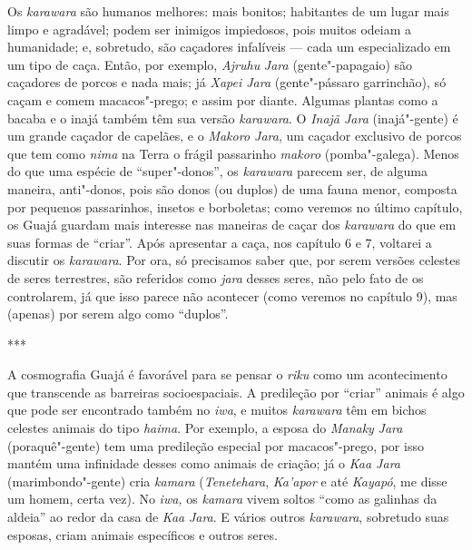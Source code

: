 Os \emph{karawara} são humanos melhores: mais bonitos; habitantes de um
lugar mais limpo e agradável; podem ser inimigos impiedosos, pois muitos
odeiam a humanidade; e, sobretudo, são caçadores infalíveis --- cada um
especializado em um tipo de caça. Então, por exemplo, \emph{Ajruhu}
\emph{Jara} (gente"-papagaio) são caçadores de porcos e nada mais; já
\emph{Xapei Jara} (gente"-pássaro garrinchão), só caçam e comem
macacos"-prego; e assim por diante. Algumas plantas como a bacaba e o
inajá também têm sua versão \emph{karawara}. O \emph{Inajã Jara}
(inajá"-gente) é um grande caçador de capelães, e o \emph{Makoro Jara},
um caçador exclusivo de porcos que tem como \emph{nima} na Terra o
frágil passarinho \emph{makoro} (pomba"-galega). Menos do que uma espécie
de ``super"-donos'', os \emph{karawara} parecem ser, de alguma maneira,
anti"-donos, pois são donos (ou duplos) de uma fauna menor, composta por
pequenos passarinhos, insetos e borboletas; como veremos no último
capítulo, os Guajá guardam mais interesse nas maneiras de caçar dos
\emph{karawara} do que em suas formas de ``criar''. Após apresentar a
caça, nos capítulo 6 e 7, voltarei a discutir os \emph{karawara}. Por
ora, só precisamos saber que, por serem versões celestes de seres
terrestres, são referidos como \emph{jara} desses seres, não pelo fato
de os controlarem, já que isso parece não acontecer (como veremos no
capítulo 9), mas (apenas) por serem algo como ``duplos''.

\begin{center}
***
\end{center}

A cosmografia Guajá é favorável para se pensar o \emph{riku} como um
acontecimento que transcende as barreiras socioespaciais. A predileção
por ``criar'' animais é algo que pode ser encontrado também no \emph{iwa},
e muitos \emph{karawara} têm em bichos celestes animais do tipo
\emph{haima}. Por exemplo, a esposa do \emph{Manaky} \emph{Jara}
(poraquê"-gente) tem uma predileção especial por macacos"-prego, por isso
mantém uma infinidade desses como animais de criação; já o \emph{Kaa
Jara} (marimbondo"-gente) cria \emph{kamara} (\emph{Tenetehara},
\emph{Ka'apor} e até \emph{Kayapó}, me disse um homem, certa vez). No
\emph{iwa,} os \emph{kamara} vivem soltos ``como as galinhas da aldeia''
ao redor da casa de \emph{Kaa} \emph{Jara}. E vários outros
\emph{karawara}, sobretudo suas esposas, criam animais específicos e
outros seres.

